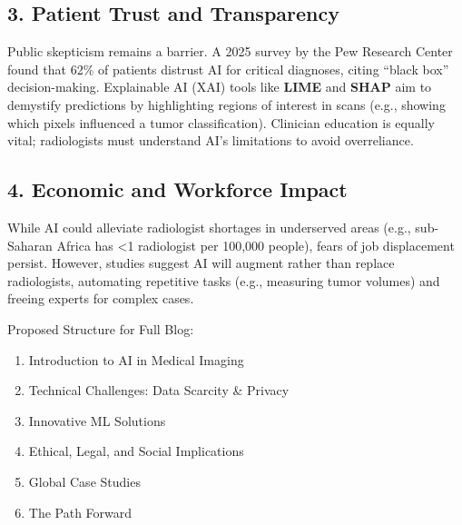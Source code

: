 \documentclass{article}
\begin{document}
\subsection*{3. Patient Trust and Transparency}
Public skepticism remains a barrier. A 2025 survey by the Pew Research Center found that 62\% of patients distrust AI for critical diagnoses, citing “black box” decision-making. Explainable AI (XAI) tools like \textbf{LIME} and \textbf{SHAP} aim to demystify predictions by highlighting regions of interest in scans (e.g., showing which pixels influenced a tumor classification). Clinician education is equally vital; radiologists must understand AI’s limitations to avoid overreliance.

\subsection*{4. Economic and Workforce Impact}
While AI could alleviate radiologist shortages in underserved areas (e.g., sub-Saharan Africa has <1 radiologist per 100,000 people), fears of job displacement persist. However, studies suggest AI will augment rather than replace radiologists, automating repetitive tasks (e.g., measuring tumor volumes) and freeing experts for complex cases. 

Proposed Structure for Full Blog:
\begin{enumerate}
    \item Introduction to AI in Medical Imaging
    \item Technical Challenges: Data Scarcity \& Privacy
    \item Innovative ML Solutions
    \item Ethical, Legal, and Social Implications
    \item Global Case Studies
    \item The Path Forward
\end{enumerate}
\end{document}
